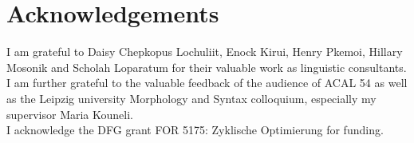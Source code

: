 \documentclass[output=paper,colorlinks,citecolor=brown
]{langscibook}
\begin{document}
\section*{Acknowledgements}

I am grateful to Daisy Chepkopus Lochuliit, Enock Kirui, Henry Pkemoi, Hillary Mosonik and Scholah Loparatum for their valuable work as linguistic consultants. I am further grateful to the valuable feedback of the audience of ACAL 54 as well as the Leipzig university Morphology and Syntax colloquium, especially my supervisor Maria Kouneli. \\ I acknowledge the DFG grant FOR 5175: Zyklische Optimierung for funding.

\sloppy
\printbibliography[heading=subbibliography,notkeyword=this]
\end{document}
